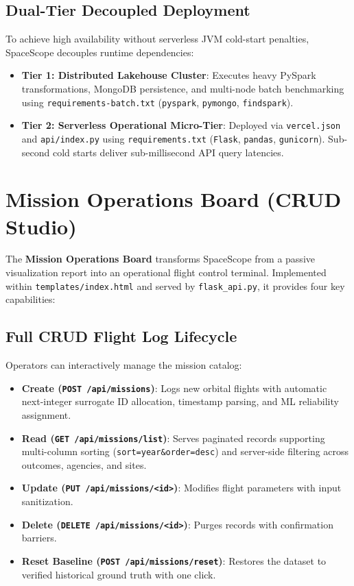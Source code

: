\documentclass[10pt]{article}
\begin{document}
\subsection{Dual-Tier Decoupled Deployment}
To achieve high availability without serverless JVM cold-start penalties, SpaceScope decouples runtime dependencies:
\begin{itemize}
    \item \textbf{Tier 1: Distributed Lakehouse Cluster}: Executes heavy PySpark transformations, MongoDB persistence, and multi-node batch benchmarking using \texttt{requirements-batch.txt} (\texttt{pyspark}, \texttt{pymongo}, \texttt{findspark}).
    \item \textbf{Tier 2: Serverless Operational Micro-Tier}: Deployed via \texttt{vercel.json} and \texttt{api/index.py} using \texttt{requirements.txt} (\texttt{Flask}, \texttt{pandas}, \texttt{gunicorn}). Sub-second cold starts deliver sub-millisecond API query latencies.
\end{itemize}

\section{Mission Operations Board (CRUD Studio)}

The \textbf{Mission Operations Board} transforms SpaceScope from a passive visualization report into an operational flight control terminal. Implemented within \texttt{templates/index.html} and served by \texttt{flask\_api.py}, it provides four key capabilities:

\subsection{Full CRUD Flight Log Lifecycle}
Operators can interactively manage the mission catalog:
\begin{itemize}
    \item \textbf{Create (\texttt{POST /api/missions})}: Logs new orbital flights with automatic next-integer surrogate ID allocation, timestamp parsing, and ML reliability assignment.
    \item \textbf{Read (\texttt{GET /api/missions/list})}: Serves paginated records supporting multi-column sorting (\texttt{sort=year\&order=desc}) and server-side filtering across outcomes, agencies, and sites.
    \item \textbf{Update (\texttt{PUT /api/missions/<id>})}: Modifies flight parameters with input sanitization.
    \item \textbf{Delete (\texttt{DELETE /api/missions/<id>})}: Purges records with confirmation barriers.
    \item \textbf{Reset Baseline (\texttt{POST /api/missions/reset})}: Restores the dataset to verified historical ground truth with one click.
\end{itemize}
\end{document}
